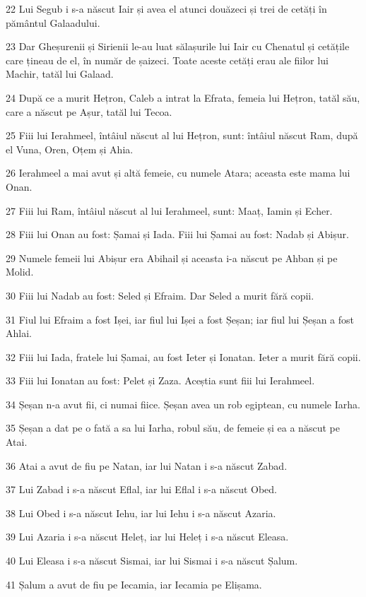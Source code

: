 \par 22 Lui Segub i s-a născut Iair și avea el atunci douăzeci și trei de cetăți în pământul Galaadului.
\par 23 Dar Gheșurenii și Sirienii le-au luat sălașurile lui Iair cu Chenatul și cetățile care țineau de el, în număr de șaizeci. Toate aceste cetăți erau ale fiilor lui Machir, tatăl lui Galaad.
\par 24 După ce a murit Hețron, Caleb a intrat la Efrata, femeia lui Hețron, tatăl său, care a născut pe Așur, tatăl lui Tecoa.
\par 25 Fiii lui Ierahmeel, întâiul născut al lui Hețron, sunt: întâiul născut Ram, după el Vuna, Oren, Oțem și Ahia.
\par 26 Ierahmeel a mai avut și altă femeie, cu numele Atara; aceasta este mama lui Onan.
\par 27 Fiii lui Ram, întâiul născut al lui Ierahmeel, sunt: Maaț, Iamin și Echer.
\par 28 Fiii lui Onan au fost: Șamai și Iada. Fiii lui Șamai au fost: Nadab și Abișur.
\par 29 Numele femeii lui Abișur era Abihail și aceasta i-a născut pe Ahban și pe Molid.
\par 30 Fiii lui Nadab au fost: Seled și Efraim. Dar Seled a murit fără copii.
\par 31 Fiul lui Efraim a fost Ișei, iar fiul lui Ișei a fost Șeșan; iar fiul lui Șeșan a fost Ahlai.
\par 32 Fiii lui Iada, fratele lui Șamai, au fost Ieter și Ionatan. Ieter a murit fără copii.
\par 33 Fiii lui Ionatan au fost: Pelet și Zaza. Aceștia sunt fiii lui Ierahmeel.
\par 34 Șeșan n-a avut fii, ci numai fiice. Șeșan avea un rob egiptean, cu numele Iarha.
\par 35 Șeșan a dat pe o fată a sa lui Iarha, robul său, de femeie și ea a născut pe Atai.
\par 36 Atai a avut de fiu pe Natan, iar lui Natan i s-a născut Zabad.
\par 37 Lui Zabad i s-a născut Eflal, iar lui Eflal i s-a născut Obed.
\par 38 Lui Obed i s-a născut Iehu, iar lui Iehu i s-a născut Azaria.
\par 39 Lui Azaria i s-a născut Heleț, iar lui Heleț i s-a născut Eleasa.
\par 40 Lui Eleasa i s-a născut Sismai, iar lui Sismai i s-a născut Șalum.
\par 41 Șalum a avut de fiu pe Iecamia, iar Iecamia pe Elișama.

